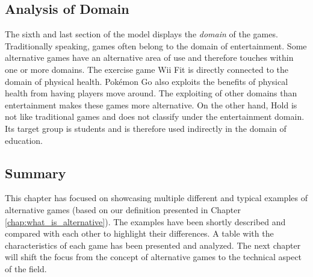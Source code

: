 \documentclass[../Main.tex]{subfiles}
\begin{document}
\subsection{Analysis of Domain}
The sixth and last section of the model displays the \textit{domain} of the games. Traditionally speaking, games often belong to the domain of entertainment. Some alternative games have an alternative area of use and therefore touches within one or more domains. The exercise game Wii Fit is directly connected to the domain of physical health. Pokémon Go also exploits the benefits of physical health from having players move around. The exploiting of other domains than entertainment makes these games more alternative. On the other hand, Hold is not like traditional games and does not classify under the entertainment domain. Its target group is students and is therefore used indirectly in the domain of education.

\subsection{Summary}
This chapter has focused on showcasing multiple different and typical examples of alternative games (based on our definition presented in Chapter \ref{chap:what_is_alternative}). The examples have been shortly described and compared with each other to highlight their differences. A table with the characteristics of each game has been presented and analyzed. The next chapter will shift the focus from the concept of alternative games to the technical aspect of the field. 

\biblio %
\end{document}
